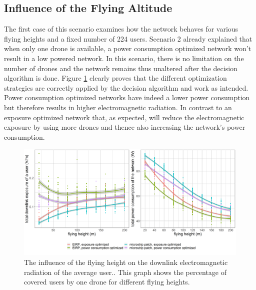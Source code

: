 \subsection{Influence of the Flying Altitude}
\label{S3A}

The first case of this scenario examines how the network behaves for various flying heights and a fixed number of 224 users.
Scenario 2 already explained that when only one drone is available, a power consumption optimized network won’t result in a low 
powered network. In this scenario, there is no limitation on the number of drones and the network remains thus unaltered after the decision 
algorithm is done. Figure \ref{fig:s3a_dlAndPc} clearly proves that the different optimization strategies are correctly applied by 
the decision algorithm and work as intended.
Power consumption optimized networks have indeed a lower power consumption but therefore results in higher electromagnetic radiation.
In contrast to an exposure optimized network that, as expected, will reduce the electromagnetic exposure by using more drones and thence also increasing the network's power consumption.

\begin{figure}[h!]
  \includegraphics[width=\textwidth]{../results/s3/fhvsdlAndPc.png}
  \caption{The influence of the flying height on the downlink electromagnetic radiation of the average user.. This graph shows the percentage of covered users by one drone for different flying heights.}
  \label{fig:s3a_dlAndPc}
\end{figure}

